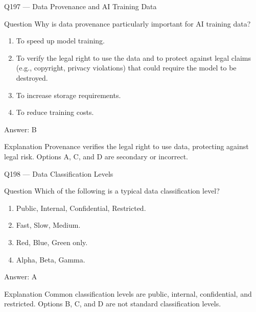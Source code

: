 \documentclass[aspectratio=169,8pt]{beamer}
\begin{document}
					\begin{frame}{Q197 --- Data Provenance and AI Training Data}
						\begin{block}{Question}
							Why is data provenance particularly important for AI training data?
							\begin{enumerate}
								\item To speed up model training.
								\item To verify the legal right to use the data and to protect against legal claims (e.g., copyright, privacy violations) that could require the model to be destroyed.
								\item To increase storage requirements.
								\item To reduce training costs.
							\end{enumerate}  \end{block}
							\begin{exampleblock}{Answer: B}\end{exampleblock}
							\begin{block}{Explanation}
								Provenance verifies the legal right to use data, protecting against legal risk. Options A, C, and D are secondary or incorrect.
							\end{block}
						\end{frame}
						
						\begin{frame}{Q198 --- Data Classification Levels}
							\begin{block}{Question}
								Which of the following is a typical data classification level?
								\begin{enumerate}
									\item Public, Internal, Confidential, Restricted.
									\item Fast, Slow, Medium.
									\item Red, Blue, Green only.
									\item Alpha, Beta, Gamma.
								\end{enumerate}  \end{block}
								\begin{exampleblock}{Answer: A}\end{exampleblock}
								\begin{block}{Explanation}
									Common classification levels are public, internal, confidential, and restricted. Options B, C, and D are not standard classification levels.
								\end{block}
							\end{frame}
							
\end{document}
